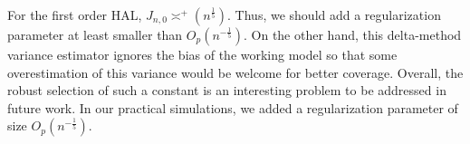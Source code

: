 
For the first order HAL, $J_{n,0}\asymp^+(n^{\frac{1}{5}})$. Thus, we should add a regularization parameter at least smaller than $O_p(n^{-\frac{1}{5}})$. On the other hand, this delta-method variance estimator ignores the bias of the working model so that some overestimation of this variance would be welcome for better coverage. 
Overall, the robust selection of such a constant is an interesting problem to be addressed in future work. In our practical simulations, we added a regularization parameter of size  $O_p(n^{-\frac{1}{5}})$.  

